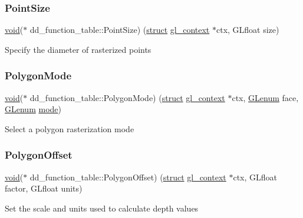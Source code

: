 \subsubsection{\texorpdfstring{Point\+Size}{PointSize}}
{\footnotesize\ttfamily \hyperlink{interfacevoid}{void}($\ast$ dd\+\_\+function\+\_\+table\+::\+Point\+Size) (\hyperlink{interfacestruct}{struct} \hyperlink{structgl__context}{gl\+\_\+context} $\ast$ctx, G\+Lfloat size)}

Specify the diameter of rasterized points \mbox{\label{structdd__function__table_a10d886b8170e9960a05c351ec600d89a}} 
\subsubsection{\texorpdfstring{Polygon\+Mode}{PolygonMode}}
{\footnotesize\ttfamily \hyperlink{interfacevoid}{void}($\ast$ dd\+\_\+function\+\_\+table\+::\+Polygon\+Mode) (\hyperlink{interfacestruct}{struct} \hyperlink{structgl__context}{gl\+\_\+context} $\ast$ctx, \hyperlink{interfacevoid}{G\+Lenum} face, \hyperlink{interfacevoid}{G\+Lenum} \hyperlink{interfacevoid}{mode})}

Select a polygon rasterization mode \mbox{\label{structdd__function__table_a9b6a80c3d27fbca5dbec612643772239}} 
\subsubsection{\texorpdfstring{Polygon\+Offset}{PolygonOffset}}
{\footnotesize\ttfamily \hyperlink{interfacevoid}{void}($\ast$ dd\+\_\+function\+\_\+table\+::\+Polygon\+Offset) (\hyperlink{interfacestruct}{struct} \hyperlink{structgl__context}{gl\+\_\+context} $\ast$ctx, G\+Lfloat factor, G\+Lfloat units)}

Set the scale and units used to calculate depth values \mbox{\label{structdd__function__table_a5928f5d5a53c3faadbbd666c6d1fd7c2}} 
